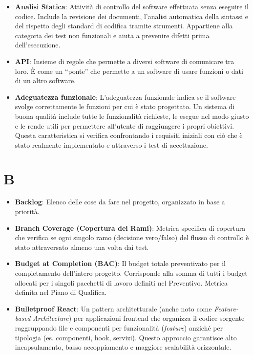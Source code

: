 \documentclass[11pt,a4paper]{article}
\begin{document}
\begin{itemize}
\item \textbf{Analisi Statica}: Attività di controllo del software effettuata senza eseguire il codice. Include la revisione dei documenti, l'analisi automatica della sintassi e del rispetto degli standard di codifica tramite strumenti. Appartiene alla categoria dei test non funzionali e aiuta a prevenire difetti prima dell'esecuzione.

\item \textbf{API}: Insieme di regole che permette a diversi software di comunicare tra loro. È come un “ponte” che permette a un software di usare funzioni o dati di un altro software.

\item \textbf{Adeguatezza funzionale}: L’adeguatezza funzionale indica se il software svolge correttamente le funzioni per cui è stato progettato. Un sistema di buona qualità include tutte le funzionalità richieste, le esegue nel modo giusto e le rende utili per permettere all’utente di raggiungere i propri obiettivi. Questa caratteristica si verifica confrontando i requisiti iniziali con ciò che è stato realmente implementato e attraverso i test di accettazione.


\end{itemize}
\newpage

\section*{B}
\begin{itemize}
\item \textbf{Backlog}: Elenco delle cose da fare nel progetto, organizzato in base a priorità.

\item \textbf{Branch Coverage (Copertura dei Rami)}: Metrica specifica di copertura che verifica se ogni singolo ramo (decisione vero/falso) del flusso di controllo è stato attraversato almeno una volta dai test.

\item \textbf{Budget at Completion (BAC)}: Il budget totale preventivato per il completamento dell'intero progetto. Corrisponde alla somma di tutti i budget allocati per i singoli pacchetti di lavoro definiti nel Preventivo. Metrica definita nel Piano di Qualifica.

\item \textbf{Bulletproof React}: Un pattern architetturale (anche noto come \textit{Feature-based Architecture}) per applicazioni frontend che organizza il codice sorgente raggruppando file e componenti per funzionalità (\textit{feature}) anziché per tipologia (es. componenti, hook, servizi). Questo approccio garantisce alto incapsulamento, basso accoppiamento e maggiore scalabilità orizzontale.

\end{itemize}
\newpage
\end{document}

